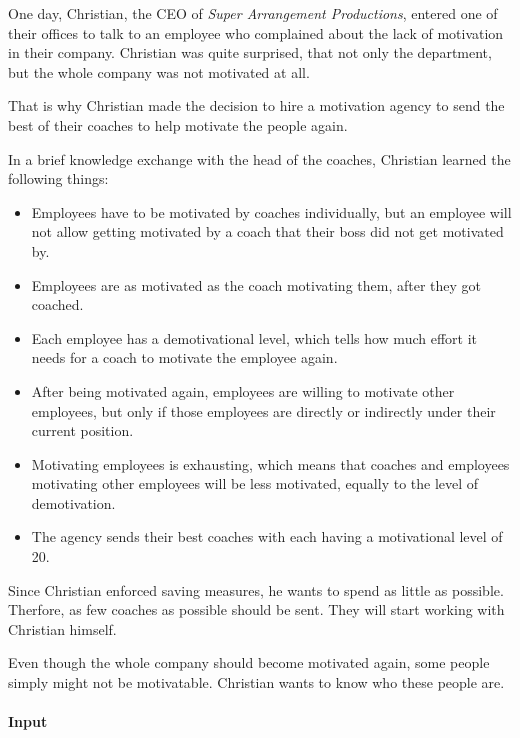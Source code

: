 



\makeheader

One day, Christian, the CEO of \textit{Super Arrangement Productions}, entered one of their offices
to talk to an employee who complained about the lack of motivation in their company. 
Christian was quite surprised, that not only the department, but the whole company was not motivated
at all.

That is why Christian made the decision to hire a motivation agency to send the best of their coaches
to help motivate the people again.

In a brief knowledge exchange with the head of the coaches, Christian learned the following things:

\begin{itemize}
  \item Employees have to be motivated by coaches individually, but an employee will not allow getting motivated
        by a coach that their boss did not get motivated by.
  \item Employees are as motivated as the coach motivating them, after they got coached.
  \item Each employee has a demotivational level, which tells how much effort it needs for a coach to
        motivate the employee again.
  \item After being motivated again, employees are willing to motivate other employees, but only if those
        employees are directly or indirectly under their current position.
  \item Motivating employees is exhausting, which means that coaches and employees motivating other employees
        will be less motivated, equally to the level of demotivation.
  \item The agency sends their best coaches with each having a motivational level of 20.
\end{itemize}

Since Christian enforced saving measures, he wants to spend as little as possible. Therfore, as few coaches 
as possible should be sent. They will start working with Christian himself.

Even though the whole company should become motivated again, some people simply might not be motivatable.
Christian wants to know who these people are.

\paragraph*{Input}

